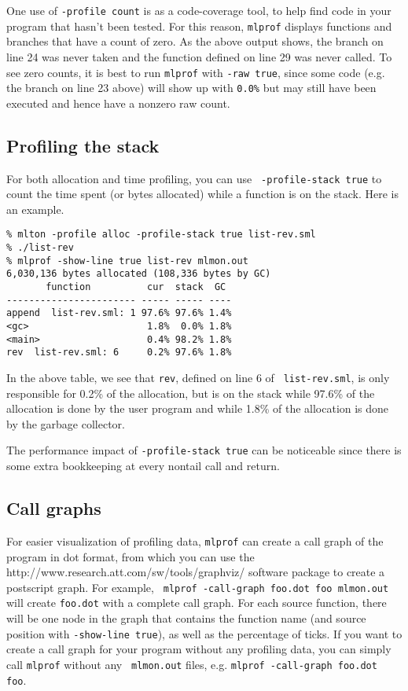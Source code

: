 One use of {\tt -profile count} is as a code-coverage tool, to help
find code in your program that hasn't been tested.  For this reason,
{\tt mlprof} displays functions and branches that have a count of
zero.  As the above output shows, the branch on line 24 was never
taken and the function defined on line 29 was never called.  To see
zero counts, it is best to run {\tt mlprof} with {\tt -raw true},
since some code (e.g. the branch on line 23 above) will show up with
{\tt 0.0\%} but may still have been executed and hence have a nonzero
raw count.
%
\subsection{Profiling the stack}

For both allocation and time profiling, you can use {\tt
-profile-stack true} to count the time spent (or bytes allocated)
while a function is on the stack.  Here is an example.

\begin{verbatim}
% mlton -profile alloc -profile-stack true list-rev.sml
% ./list-rev
% mlprof -show-line true list-rev mlmon.out
6,030,136 bytes allocated (108,336 bytes by GC)
       function          cur  stack  GC 
----------------------- ----- ----- ----
append  list-rev.sml: 1 97.6% 97.6% 1.4%
<gc>                     1.8%  0.0% 1.8%
<main>                   0.4% 98.2% 1.8%
rev  list-rev.sml: 6     0.2% 97.6% 1.8%
\end{verbatim}
%
In the above table, we see that {\tt rev}, defined on line 6 of {\tt
list-rev.sml}, is only responsible for 0.2\% of the allocation, but is
on the stack while 97.6\% of the allocation is done by the user
program and while 1.8\% of the allocation is done by the garbage
collector.

The performance impact of {\tt -profile-stack true} can be noticeable
since there is some extra bookkeeping at every nontail call and
return.
%
\subsection{Call graphs}

For easier visualization of profiling data, {\tt mlprof} can create a
call graph of the program in dot format, from which you can use the
		  {http://www.research.att.com/sw/tools/graphviz/}
software package to create a postscript graph.  For example, {\tt
mlprof -call-graph foo.dot foo mlmon.out} will create {\tt foo.dot}
with a complete call graph.  For each source function, there will be
one node in the graph that contains the function name (and source
position with {\tt -show-line true}), as well as the percentage of
ticks.  If you want to create a call graph for your program without
any profiling data, you can simply call {\tt mlprof} without any {\tt
mlmon.out} files, e.g. {\tt mlprof -call-graph foo.dot foo}.

